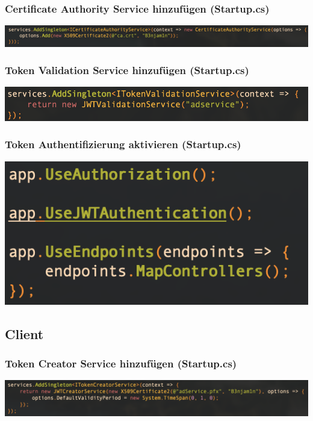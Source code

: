 \documentclass[14pt,a4paper]{extarticle}
\begin{document}
	\subsubsection*{Certificate Authority Service hinzufügen (Startup.cs)}
	\begin{center}
		\includegraphics[width=\textwidth]{images/CAService.png}
	\end{center}
	
	\subsubsection*{Token Validation Service hinzufügen (Startup.cs)}
	\begin{center}
		\includegraphics[width=\textwidth]{images/AddTokenValidator.png}
	\end{center}

	\subsubsection*{Token Authentifizierung aktivieren (Startup.cs)}
	\begin{center}
		\includegraphics{images/UseAuth.png}
	\end{center}

	\newpage
	\subsection{Client}

	\subsubsection*{Token Creator Service hinzufügen (Startup.cs)}
	\begin{center}
		\includegraphics[width=\textwidth]{images/AddTokenCreator.png}
	\end{center}
	
\end{document}
